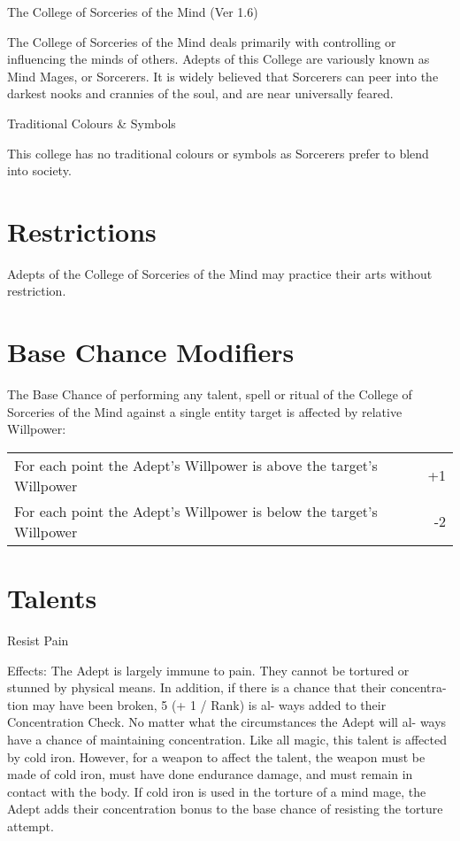 \begin{Chapter}{The College of Sorceries of the Mind (Ver 1.6)}

The College of Sorceries of the Mind deals primarily with controlling
or influencing the minds of others. Adepts of this College are
variously known as Mind Mages, or Sorcerers. It is widely believed
that Sorcerers can peer into the darkest nooks and crannies of the
soul, and are near universally feared.

Traditional Colours \& Symbols  

This college has no traditional colours or symbols as Sorcerers prefer
to blend into society.

\section{Restrictions}

Adepts of the College of Sorceries of the Mind may practice their arts
without restriction.


\section{Base Chance Modifiers}

The Base Chance of performing any talent, spell or ritual of the
College of Sorceries of the Mind against a single entity target is
affected by relative Willpower:

\begin{tabularx}{\columnwidth}{Xr}
For each point the Adept’s Willpower is above the target’s Willpower & +1 \\
For each point the Adept’s Willpower is below the target’s Willpower & -2 \\
\end{tabularx}

\section{Talents }

\begin{talent}[T-1]{Resist Pain }

Effects: The Adept is largely immune to pain. They 
cannot  be  tortured  or  stunned  by  physical  means. 
In addition, if there is a chance that their concentra-
tion  may  have  been  broken,  5  (+  1  /  Rank)  is  al-
ways  added  to  their  Concentration  Check.  No 
matter  what  the  circumstances  the  Adept  will  al-
ways  have  a  chance  of  maintaining  concentration. 
Like all magic, this talent is affected by cold iron. 
However,  for  a  weapon  to  affect  the  talent,  the 
weapon must be made of cold iron, must have done 
endurance  damage,  and  must  remain  in  contact 
with the body. If cold iron is used in the torture of 
a  mind  mage,  the  Adept  adds  their  concentration 
bonus  to  the  base  chance  of  resisting  the  torture 
attempt. 


\end{talent}
\end{Chapter}
